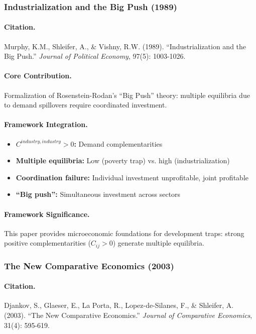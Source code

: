 \subsubsection{Industrialization and the Big Push (1989)}

\paragraph{Citation.}
Murphy, K.M., Shleifer, A., \& Vishny, R.W. (1989).
``Industrialization and the Big Push.''
\emph{Journal of Political Economy}, 97(5): 1003-1026.

\paragraph{Core Contribution.}
Formalization of Rosenstein-Rodan's ``Big Push'' theory: multiple equilibria
due to demand spillovers require coordinated investment.

\paragraph{Framework Integration.}
\begin{itemize}
  \item \textbf{$C^{industry,industry} > 0$:} Demand complementarities
  \item \textbf{Multiple equilibria:} Low (poverty trap) vs. high (industrialization)
  \item \textbf{Coordination failure:} Individual investment unprofitable, joint profitable
  \item \textbf{``Big push'':} Simultaneous investment across sectors
\end{itemize}

\paragraph{Framework Significance.}
This paper provides microeconomic foundations for development traps:
strong positive complementarities ($C_{ij} > 0$) generate multiple equilibria.

\subsubsection{The New Comparative Economics (2003)}

\paragraph{Citation.}
Djankov, S., Glaeser, E., La Porta, R., Lopez-de-Silanes, F., \& Shleifer, A. (2003).
``The New Comparative Economics.''
\emph{Journal of Comparative Economics}, 31(4): 595-619.

